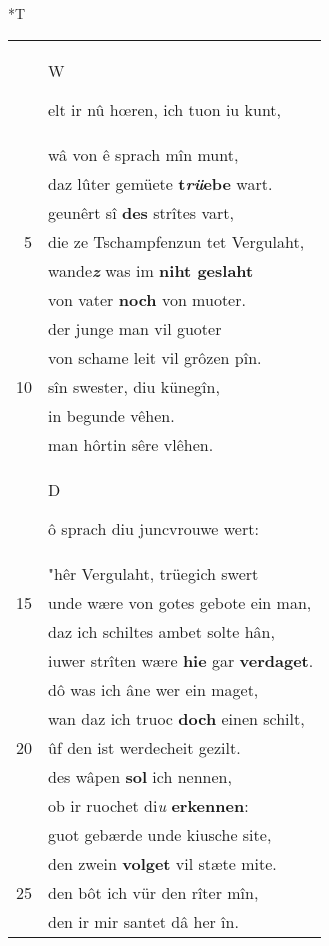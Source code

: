 \documentclass[8pt,a4paper,notitlepage]{article}
\begin{document}
\begin{table}[ht]
\hspace{0.5cm}
\begin{minipage}[t]{0.5\linewidth}
\small
\begin{center}*T
\end{center}
\begin{tabular}{rl}
 & \begin{large}W\end{large}elt ir nû hœren, ich tuon iu kunt,\\ 
 & wâ von ê sprach mîn munt,\\ 
 & daz lûter gemüete \textbf{t\textit{rü}ebe} wart.\\ 
 & geunêrt sî \textbf{des} strîtes vart,\\ 
5 & die ze Tschampfenzun tet Vergulaht,\\ 
 & wande\textit{\textbf{z}} was im \textbf{niht geslaht}\\ 
 & von vater \textbf{noch} von muoter.\\ 
 & der junge man vil guoter\\ 
 & von schame leit vil grôzen pîn.\\ 
10 & sîn swester, diu künegîn,\\ 
 & in begunde vêhen.\\ 
 & man hôrtin sêre vlêhen.\\ 
 & \begin{large}D\end{large}ô sprach diu juncvrouwe wert:\\ 
 & "hêr Vergulaht, trüegich swert\\ 
15 & unde wære von gotes gebote ein man,\\ 
 & daz ich schiltes ambet solte hân,\\ 
 & iuwer strîten wære \textbf{hie} gar \textbf{verdaget}.\\ 
 & dô was ich âne wer ein maget,\\ 
 & wan daz ich truoc \textbf{doch} einen schilt,\\ 
20 & ûf den ist werdecheit gezilt.\\ 
 & des wâpen \textbf{sol} ich nennen,\\ 
 & ob ir ruochet di\textit{u} \textbf{erkennen}:\\ 
 & guot gebærde unde kiusche site,\\ 
 & den zwein \textbf{volget} vil stæte mite.\\ 
25 & den bôt ich vür den rîter mîn,\\ 
 & den ir mir santet dâ her în.\\ 

\end{tabular}
\end{minipage}
\end{table}
\end{document}
